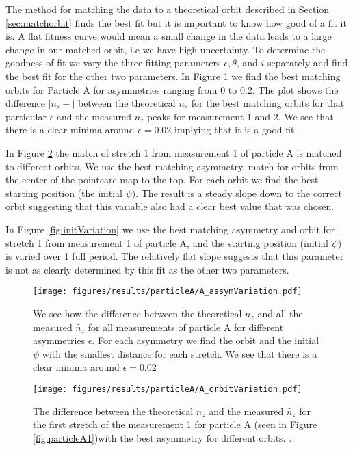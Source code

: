  The method for matching the data to a theoretical orbit described in Section \ref{sec:matchorbit} finds the best fit but it is important to know how good of a fit it is. A flat fitness curve would mean a small change in the data leads to a large change in our matched orbit, i.e we have high uncertainty. To determine the goodness of fit we vary the three fitting parameters $\epsilon, \theta$, and $i$ separately and find the best fit for the other two parameters. In Figure \ref{fig:asymVariation} we find the best matching orbits for Particle A for asymmetries ranging from 0 to 0.2. The plot shows the difference $\left|n_z - \right|$ between the theoretical $n_z$ for the best matching orbits for that particular $\epsilon$ and the measured $n_z$ peaks for measurement 1 and 2. We see that there is a clear minima around $\epsilon = 0.02$ implying that it is a good fit.
 
 In Figure \ref{fig:orbitVariation} the match of stretch 1 from measurement 1 of particle A is matched to different orbits. We use the best matching asymmetry, match for orbits from the center of the pointcare map to the top. For each orbit we find the best starting position (the initial $\psi$). The result is a steady slope down to the correct orbit suggesting that this variable also had a clear best value that was chosen. 
 
 In Figure \ref{fig:initVariation} we use the best matching asymmetry and orbit for stretch 1 from measurement 1 of particle A, and the starting position (initial $\psi$) is varied over 1 full period. The relatively flat slope suggests that this parameter is not as clearly determined by this fit as the other two parameters. 
 
 \begin{figure}[H]
 \begin{center}
 \texttt{[image: figures/results/particleA/A\_assymVariation.pdf]}
 \end{center}
 \caption{We see how the difference between the theoretical $n_z$ and all the measured  $\widetilde{n_z}$ for all measurements of particle A for different asymmetries $\epsilon$. For each asymmetry we find the orbit and the initial $\psi$ with the smallest distance for each stretch. We see that there is a clear minima around $\epsilon = 0.02$}
 \label{fig:asymVariation}
 \end{figure}
 
 \begin{figure}[H]
 \begin{center}
 \texttt{[image: figures/results/particleA/A\_orbitVariation.pdf]}
 \end{center}
 \caption{The difference between the theoretical $n_z$ and the measured $\widetilde{n_z}$ for the first stretch of the measurement 1 for particle A (seen in Figure \ref{fig:particleA1})with the best asymmetry for different orbits. .}
 \label{fig:orbitVariation}
 \end{figure}
 
